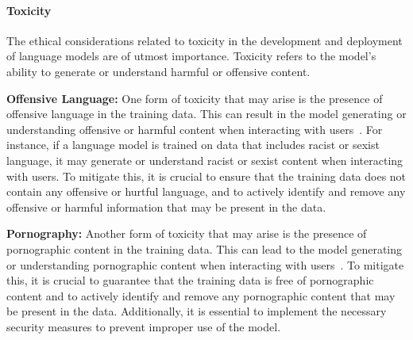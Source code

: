 \paragraph{Toxicity}

The ethical considerations related to toxicity in the development and deployment of language models are of utmost importance. Toxicity refers to the model's ability to generate or understand harmful or offensive content.

\textbf{Offensive Language:} One form of toxicity that may arise is the presence of offensive language in the training data. This can result in the model generating or understanding offensive or harmful content when interacting with users~\cite{gehman2020realtoxicityprompts}. For instance, if a language model is trained on data that includes racist or sexist language, it may generate or understand racist or sexist content when interacting with users. To mitigate this, it is crucial to ensure that the training data does not contain any offensive or hurtful language, and to actively identify and remove any offensive or harmful information that may be present in the data.

\textbf{Pornography:} Another form of toxicity that may arise is the presence of pornographic content in the training data. This can lead to the model generating or understanding pornographic content when interacting with users~\cite{solaiman2021process}. To mitigate this, it is crucial to guarantee that the training data is free of pornographic content and to actively identify and remove any pornographic content that may be present in the data. Additionally, it is essential to implement the necessary security measures to prevent improper use of the model.